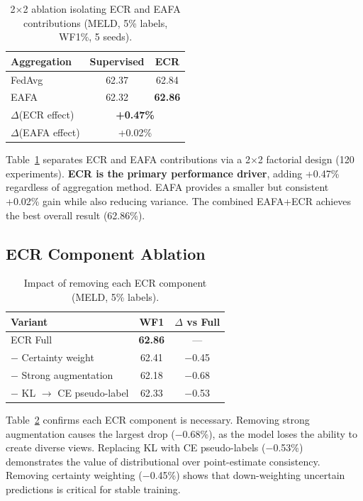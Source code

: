 \documentclass[letterpaper]{article}
\begin{document}
\begin{table}[t]
\centering
\caption{2$\times$2 ablation isolating ECR and EAFA contributions
(MELD, 5\% labels, WF1\%, 5 seeds).}
\label{tab:ablation}
\begin{tabular}{l cc}
\toprule
\textbf{Aggregation} & Supervised & ECR \\
\midrule
FedAvg & 62.37 & 62.84 \\
EAFA   & 62.32 & \textbf{62.86} \\
\midrule
$\Delta$(ECR effect) & \multicolumn{2}{c}{\textbf{+0.47\%}} \\
$\Delta$(EAFA effect) & \multicolumn{2}{c}{+0.02\%} \\
\bottomrule
\end{tabular}
\end{table}

Table~\ref{tab:ablation} separates ECR and EAFA contributions via a 2$\times$2
factorial design (120 experiments). \textbf{ECR is the primary performance driver},
adding +0.47\% regardless of aggregation method. EAFA provides a smaller but
consistent +0.02\% gain while also reducing variance. The combined EAFA+ECR
achieves the best overall result (62.86\%).

\subsection{ECR Component Ablation}

\begin{table}[t]
\centering
\caption{Impact of removing each ECR component (MELD, 5\% labels).}
\label{tab:ecr_ablation}
\begin{tabular}{l c c}
\toprule
\textbf{Variant} & WF1 & $\Delta$ vs Full \\
\midrule
ECR Full & \textbf{62.86} & --- \\
\quad $-$ Certainty weight & 62.41 & $-$0.45 \\
\quad $-$ Strong augmentation & 62.18 & $-$0.68 \\
\quad $-$ KL $\to$ CE pseudo-label & 62.33 & $-$0.53 \\
\bottomrule
\end{tabular}
\end{table}

Table~\ref{tab:ecr_ablation} confirms each ECR component is necessary.
Removing strong augmentation causes the largest drop ($-$0.68\%), as the model
loses the ability to create diverse views. Replacing KL with CE pseudo-labels
($-$0.53\%) demonstrates the value of distributional over point-estimate
consistency. Removing certainty weighting ($-$0.45\%) shows that down-weighting
uncertain predictions is critical for stable training.
\end{document}
